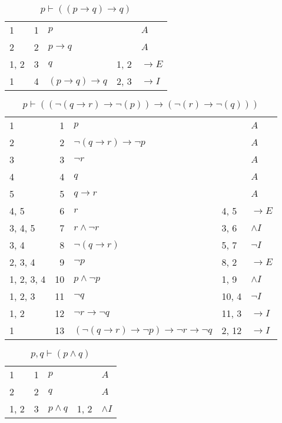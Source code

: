 \documentclass{article}
\begin{document}
\begin{table}[htbp]\caption*{$p ⊢ ((p → q) → q)$}\centering\begin{tabular}{lrlll}
{1} & 1 & $p$ & {} & $A$ \\
{2} & 2 & $p→q$ & {} & $A$ \\
{1, 2} & 3 & $q$ & {1, 2} & $→E$ \\
{1} & 4 & $(p→q)→q$ & {2, 3} & $→I$ \\
\end{tabular}
\end{table}
\begin{table}[htbp]\caption*{$p ⊢ ((¬(q→r)→ ¬(p))→ (¬(r)→ ¬(q)))$}\centering\begin{tabular}{lrlll}
{1} & 1 & $p$ & {} & $A$ \\
{2} & 2 & $¬ (q→r)→ ¬p$ & {} & $A$ \\
{3} & 3 & $¬r$ & {} & $A$ \\
{4} & 4 & $q$ & {} & $A$ \\
{5} & 5 & $q→r$ & {} & $A$ \\
{4, 5} & 6 & $r$ & {4, 5} & $→E$ \\
{3, 4, 5} & 7 & $r∧ ¬r$ & {3, 6} & $∧I$ \\
{3, 4} & 8 & $¬ (q→r)$ & {5, 7} & $¬I$ \\
{2, 3, 4} & 9 & $¬p$ & {8, 2} & $→E$ \\
{1, 2, 3, 4} & 10 & $p∧ ¬p$ & {1, 9} & $∧I$ \\
{1, 2, 3} & 11 & $¬q$ & {10, 4} & $¬I$ \\
{1, 2} & 12 & $¬r→ ¬q$ & {11, 3} & $→I$ \\
{1} & 13 & $(¬ (q→r)→ ¬p)→ ¬r→ ¬q$ & {2, 12} & $→I$ \\
\end{tabular}
\end{table}
\begin{table}[htbp]\caption*{$p,q ⊢ (p ∧ q)$}\centering\begin{tabular}{lrlll}
{1} & 1 & $p$ & {} & $A$ \\
{2} & 2 & $q$ & {} & $A$ \\
{1, 2} & 3 & $p∧q$ & {1, 2} & $∧I$ \\
\end{tabular}
\end{table}
\end{document}

